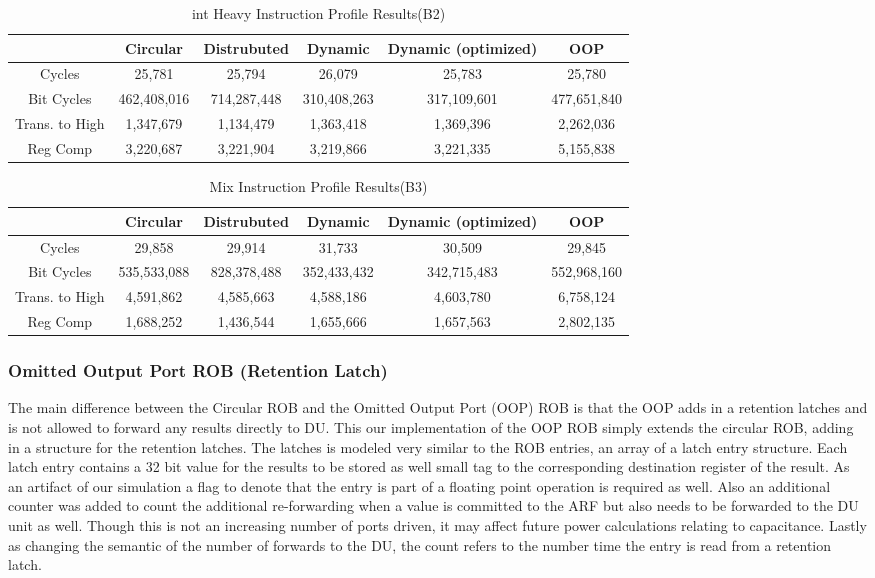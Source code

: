 \begin{table*}[!tb]
\centering
\caption{int Heavy Instruction Profile Results(B2)}
\begin{tabular}{|c|c|c|c|c|c|} \hline
    & Circular  & Distrubuted & Dynamic & Dynamic (optimized) & OOP\\ \hline
Cycles&25,781&	25,794&	26,079	&25,783	&25,780\\ \hline
Bit Cycles&462,408,016	&714,287,448	&310,408,263	&317,109,601	&477,651,840\\ \hline
Trans. to High&1,347,679&	1,134,479	&1,363,418&	1,369,396	&2,262,036\\ \hline
Reg Comp&3,220,687	&3,221,904	&3,219,866	&3,221,335&	5,155,838\\ \hline
\end{tabular}
\label{tab:bench2}
\end{table*}

\begin{table*}[!tb]
\centering
\caption{Mix Instruction Profile Results(B3)}
\begin{tabular}{|c|c|c|c|c|c|} \hline
    & Circular  & Distrubuted & Dynamic & Dynamic (optimized) & OOP\\ \hline
Cycles&29,858	&29,914	&31,733	&30,509	&29,845\\ \hline

Bit Cycles&535,533,088&	828,378,488&	352,433,432	&342,715,483	&552,968,160\\ \hline

Trans. to High&4,591,862	&4,585,663	&4,588,186&	4,603,780&	6,758,124\\ \hline

Reg Comp&1,688,252&	1,436,544	&1,655,666	&1,657,563	&2,802,135\\ \hline
\end{tabular}
\label{tab:bench3}
\end{table*}


\subsubsection{Omitted Output Port ROB (Retention Latch)}
The main difference between the Circular ROB and the Omitted Output Port (OOP) ROB is that the OOP adds in a retention latches and is not allowed to forward any results directly to DU.  This our implementation of the OOP ROB simply extends the circular ROB, adding in a structure for the retention latches.  The latches is modeled very similar to the ROB entries, an array
of a latch entry structure.  Each latch entry contains a 32 bit value for the results to be stored as well small tag to the corresponding destination register of the result.  As an artifact of our simulation a flag to denote that the entry is part of a floating point operation is required as well.  Also an additional counter was added to count the additional re-forwarding when a value is committed to the ARF but also needs to be forwarded to the DU unit as well.  Though this is not an increasing number of ports driven, it may affect future power calculations relating to capacitance.  Lastly as changing the semantic of the number of forwards to the DU, the count refers to the number time the entry is read from a retention latch.

